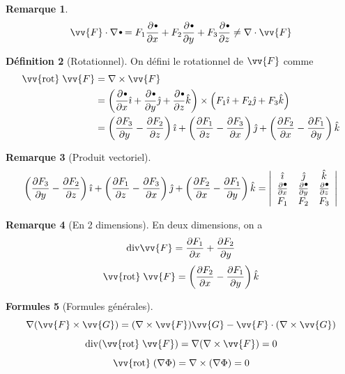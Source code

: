 \documentclass[11pt,a4paper]{article}
\theoremstyle{definition}
\newtheorem{mydef}{Définition}%
\newtheorem{myrem}[mydef]{Remarque}
\newtheorem{myform}[mydef]{Formules}
\newcommand{\kmath}{k}
\renewcommand{\div}{\mathrm{div}}
\newcommand{\rot}{\vv{\mathrm{rot}}\;}
\newcommand{\sbt}{\,\begin{picture}(-1,1)(-1,-3)\circle*{2.5}\end{picture}\ }
\newcommand{\pa}{\partial}
\begin{document}
\begin{myrem}
	\[ \vv{F} \cdot \nabla \sbt = F_1 \frac{\pa \sbt}{\pa x} + F_2 \frac{\pa \sbt}{\pa y} + F_3 \frac{\pa \sbt}{\pa z}
	\neq \nabla \cdot \vv{F} \]
\end{myrem}

\begin{mydef}[Rotationnel] On défini le rotationnel de $\vv{F}$ comme
	\begin{align*} \rot \vv{F} & = \nabla \times \vv{F} \\
		& = \left( \frac{\pa \sbt}{\pa x} \hat{\imath} + \frac{\pa \sbt}{\pa y} \hat{\jmath} + \frac{\pa \sbt}{\pa z} \hat{\kmath} \right) \times \left( F_1 \hat{\imath} + F_2 \hat{\jmath} + F_3 \hat{\kmath} \right) \\
		& = \left( \frac{\pa F_3}{\pa y} -  \frac{\pa F_2}{\pa z} \right) \hat{\imath} + \left( \frac{\pa F_1}{\pa z} -  \frac{\pa F_3}{\pa x} \right) \hat{\jmath} + \left( \frac{\pa F_2}{\pa x} -  \frac{\pa F_1}{\pa y} \right) \hat{\kmath}
	\end{align*}
\end{mydef}

\begin{myrem}[Produit vectoriel]
	\[ \left( \frac{\pa F_3}{\pa y} -  \frac{\pa F_2}{\pa z} \right) \hat{\imath} + \left( \frac{\pa F_1}{\pa z} -  \frac{\pa F_3}{\pa x} \right) \hat{\jmath} + \left( \frac{\pa F_2}{\pa x} -  \frac{\pa F_1}{\pa y} \right) \hat{\kmath} =
	\left|
	\begin{array}{ccc}
		\hat{\imath} & \hat{\jmath} & \hat{\kmath} \\
		\frac{\pa \sbt}{\pa x} & \frac{\pa \sbt}{\pa y} & \frac{\pa \sbt}{\pa z} \\
		F_1 & F_2 & F_3
	\end{array}
	\right| \]
\end{myrem}

\begin{myrem}[En 2 dimensions]
	En deux dimensions, on a
	\[ \div \vv{F} = \frac{\pa F_1}{\pa x} + \frac{\pa F_2}{\pa y} \]
	\[ \rot \vv{F} = \left( \frac{\pa F_2}{\pa x} - \frac{\pa F_1}{\pa y} \right) \hat{k} \]
\end{myrem}

\begin{myform}[Formules générales]
	\[ \nabla (\vv{F} \times \vv{G}) = (\nabla \times \vv{F})\vv{G} - \vv{F} \cdot (\nabla \times \vv{G}) \]
	\[ \div ( \rot \vv{F}) = \nabla (\nabla \times \vv{F}) = 0 \]
	\[ \rot (\nabla \Phi) = \nabla \times (\nabla \Phi) = 0 \]
\end{myform}
\end{document}
